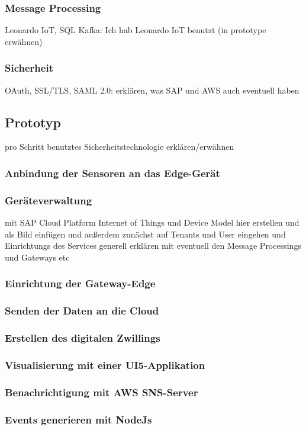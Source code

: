 \subsubsection{Message Processing}
Leonardo IoT, SQL Kafka: Ich hab Leonardo IoT benutzt (in prototype erwähnen)

\subsubsection{Sicherheit}
OAuth, SSL/TLS, SAML 2.0: erklären, was SAP und AWS auch eventuell haben

\subsection{Prototyp}
pro Schritt benutztes Sicherheitstechnologie erklären/erwähnen

\subsubsection{Anbindung der Sensoren an das Edge-Gerät}

\subsubsection{Geräteverwaltung}
mit SAP Cloud Platform Internet of Things und Device Model hier erstellen und als Bild einfügen und außerdem
zunächst auf Tenants und User eingehen und Einrichtungs des Services generell erklären mit eventuell den Message Processings
und Gateways etc

\subsubsection{Einrichtung der Gateway-Edge}

\subsubsection{Senden der Daten an die Cloud}

\subsubsection{Erstellen des digitalen Zwillings}

\subsubsection{Visualisierung mit einer UI5-Applikation}

\subsubsection{Benachrichtigung mit AWS SNS-Server}

\subsubsection{Events generieren mit NodeJs}

\newpage